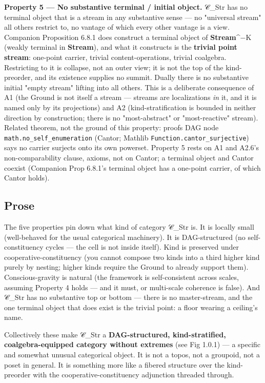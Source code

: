 \documentclass[11pt, openany]{book}
\begin{document}
\textbf{Property 5 --- No substantive terminal / initial object.} 𝒞\_\allowbreak{}Str has no terminal object that is a stream in any substantive sense --- no "universal stream" all others restrict to, no vantage of which every other vantage is a view. Companion Proposition 6.8.1 does construct a terminal object of \textbf{Stream}\textasciicircum{}{−K} (weakly terminal in \textbf{Stream}), and what it constructs is the \textbf{trivial point stream}: one-point carrier, trivial content-operations, trivial coalgebra. Restricting to it is collapse, not an outer view; it is not the top of the kind-preorder, and its existence supplies no summit. Dually there is no substantive initial "empty stream" lifting into all others. This is a deliberate consequence of A1 (the Ground is not itself a stream --- streams are localizations \textit{in} it, and it is named only by its projections) and A2 (kind-stratification is bounded in neither direction by construction; there is no "most-abstract" or "most-reactive" stream). Related theorem, not the ground of this property: proofs DAG node \texttt{math.no\_self\_enumeration} (Cantor; Mathlib \texttt{Function.cantor\_surjective}) says no carrier surjects onto its own powerset. Property 5 rests on A1 and A2.6's non-comparability clause, axioms, not on Cantor; a terminal object and Cantor coexist (Companion Prop 6.8.1's terminal object has a one-point carrier, of which Cantor holds).

\subsection{Prose}

The five properties pin down what kind of category 𝒞\_\allowbreak{}Str is. It is locally small (well-behaved for the usual categorical machinery). It is DAG-structured (no self-constituency cycles --- the cell is not inside itself). Kind is preserved under cooperative-constituency (you cannot compose two kinds into a third higher kind purely by nesting; higher kinds require the Ground to already support them). Conscious-gravity is natural (the framework is self-consistent across scales, assuming Property 4 holds --- and it must, or multi-scale coherence is false). And 𝒞\_\allowbreak{}Str has no substantive top or bottom --- there is no master-stream, and the one terminal object that does exist is the trivial point: a floor wearing a ceiling's name.

Collectively these make 𝒞\_\allowbreak{}Str a \textbf{DAG-structured, kind-stratified, coalgebra-equipped category without extremes} (see Fig 1.0.1) --- a specific and somewhat unusual categorical object. It is not a topos, not a groupoid, not a poset in general. It is something more like a fibered structure over the kind-preorder with the cooperative-constituency adjunction threaded through.
\end{document}
